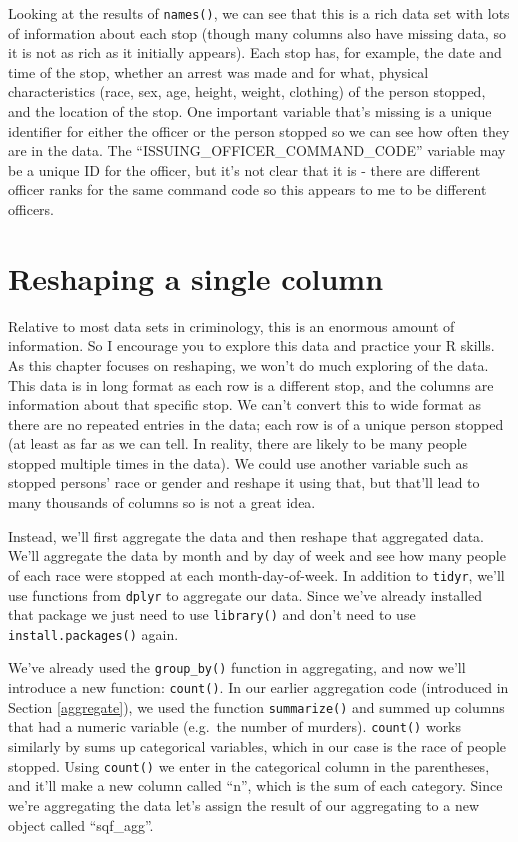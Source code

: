 \documentclass[
  a4paper,
]{krantz}
\begin{document}
Looking at the results of \texttt{names()}, we can see that
this is a rich data set with lots of information about each
stop (though many columns also have missing data, so it is
not as rich as it initially appears). Each stop has, for
example, the date and time of the stop, whether an arrest
was made and for what, physical characteristics (race, sex,
age, height, weight, clothing) of the person stopped, and
the location of the stop. One important variable that's
missing is a unique identifier for either the officer or the
person stopped so we can see how often they are in the data.
The ``ISSUING\_OFFICER\_COMMAND\_CODE'' variable may be a
unique ID for the officer, but it's not clear that it is -
there are different officer ranks for the same command code
so this appears to me to be different officers.

\hypertarget{reshaping-a-single-column}{%
\section{Reshaping a single
column}\label{reshaping-a-single-column}}

Relative to most data sets in criminology, this is an
enormous amount of information. So I encourage you to
explore this data and practice your R skills. As this
chapter focuses on reshaping, we won't do much exploring of
the data. This data is in long format as each row is a
different stop, and the columns are information about that
specific stop. We can't convert this to wide format as there
are no repeated entries in the data; each row is of a unique
person stopped (at least as far as we can tell. In reality,
there are likely to be many people stopped multiple times in
the data). We could use another variable such as stopped
persons' race or gender and reshape it using that, but
that'll lead to many thousands of columns so is not a great
idea.

Instead, we'll first aggregate the data and then reshape
that aggregated data. We'll aggregate the data by month and
by day of week and see how many people of each race were
stopped at each month-day-of-week. In addition to
\texttt{tidyr}, we'll use functions from \texttt{dplyr} to
aggregate our data. Since we've already installed that
package we just need to use \texttt{library()} and don't
need to use \texttt{install.packages()} again.

We've already used the \texttt{group\_by()} function in
aggregating, and now we'll introduce a new function:
\texttt{count()}. In our earlier aggregation code
(introduced in Section \ref{aggregate}), we used the
function \texttt{summarize()} and summed up columns that had
a numeric variable (e.g.~the number of murders).
\texttt{count()} works similarly by sums up categorical
variables, which in our case is the race of people stopped.
Using \texttt{count()} we enter in the categorical column in
the parentheses, and it'll make a new column called ``n'',
which is the sum of each category. Since we're aggregating
the data let's assign the result of our aggregating to a new
object called ``sqf\_agg''.
\end{document}
